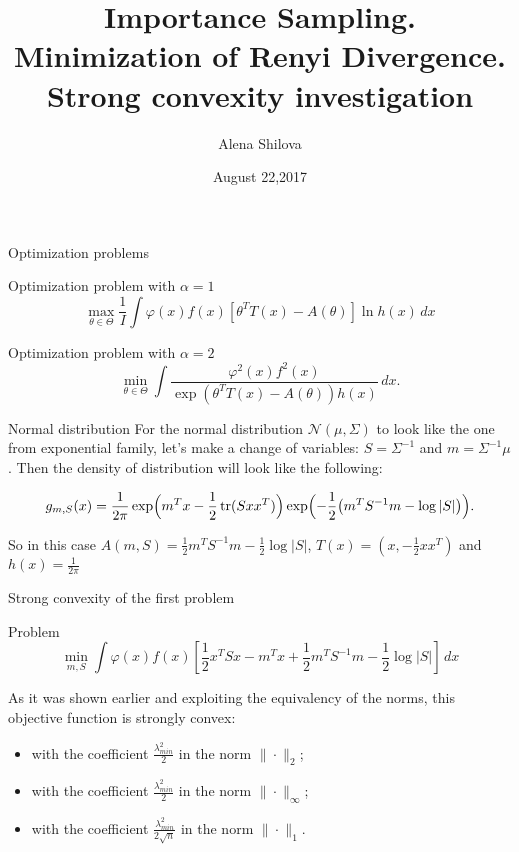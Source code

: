 \documentclass[10pt]{beamer}
\title{Importance Sampling. \\ Minimization of Renyi Divergence. \\
Strong convexity investigation}
\author{Alena Shilova}
\date{August 22,2017}
\institute{Skoltech}
\DeclareMathOperator{\tr}{tr}
\begin{document}
\maketitle


\begin{frame}{Optimization problems}

\begin{block}{Optimization problem with $\alpha  = 1$}
\[
\max_{\theta \in \Theta} \frac 1I \int  \varphi(x) f(x) \left[ \theta^T T(x) - A(\theta) \right] \ln h(x) \, dx
\]
\end{block}

\begin{block}{Optimization problem with $\alpha = 2$}
\[
 \min_{\theta \in \Theta} \int \frac{\varphi^2(x)f^2(x)}{\exp(\theta^TT(x) - A(\theta))h(x)} \, dx. 
\]
\end{block}

\end{frame}

\begin{frame}{Normal distribution}
For the normal distribution $\mathcal{N} (\mu, \Sigma)$ to look like the one from exponential family, let's make a change of variables: $S = \Sigma^{-1}$ and $m = \Sigma^{-1} \mu$. Then the density of distribution will look like the following:

\[
g_{m,S}(x) = \frac1{2\pi} \exp \Bigl( m^T x - \frac 12 \tr( Sxx^T ) \Bigr) \exp \Bigl(- \frac 1 2 \bigl( m^TS^{-1}m - \log |S| \bigr) \Bigr).
\]

So in this case $A(m, S) = \frac 12 m^TS^{-1} m - \frac 12 \log |S|$, $T(x) = (x, -\frac 12 xx^T)$ and $h(x) = \frac 1{2\pi}$

\end{frame}

\begin{frame}{Strong convexity of the first problem}
\begin{block}{Problem}
\[
\min_{m,S} \int \varphi(x)f(x)\left[\frac12 x^TSx - m^Tx + \frac12 m^T S^{-1}m - \frac 12 \log |S|  \right] \, dx
\]
\end{block}

As it was shown earlier and exploiting the equivalency of the norms, this objective function is strongly convex:
\begin{itemize}
\item with the coefficient $\frac{\lambda_{min}^2}{2}$ in the norm $\|\cdot\|_2$;
\item with the coefficient $\frac{\lambda_{min}^2}{2}$ in the norm $\|\cdot\|_{\infty}$;
\item with the coefficient $\frac{\lambda_{min}^2}{2 \sqrt{n}}$ in the norm $\|\cdot\|_{1}$.

\end{itemize}
\end{frame}
\end{document}
